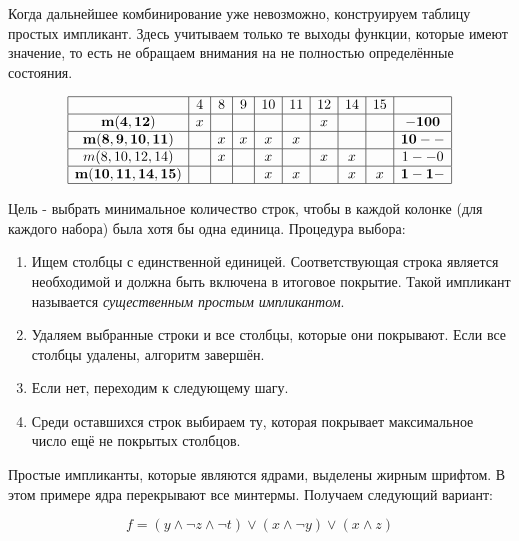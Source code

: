 \documentclass[12pt,letterpaper]{article}
\begin{document}
Когда дальнейшее комбинирование уже невозможно, конструируем таблицу простых импликант. Здесь учитываем только те выходы функции, которые имеют значение, то есть не обращаем внимания на не полностью определённые состояния.

\[
\begin{array}{|c|c|c|c|c|c|c|c|c|c|}
\hline
 & 4 & 8 & 9 & 10 & 11 & 12 & 14 & 15 & \\
\hline
\mathbf{m(4,12)} & x &   &   &   &   & x &   &   & \mathbf{-100} \\
\hline
\mathbf{m(8,9,10,11)} &   & x & x & x & x &   &   &   & \mathbf{10--} \\
\hline
m(8,10,12,14) &   & x &   & x &   & x & x &   & 1--0 \\
\hline
\mathbf{m(10,11,14,15)} &   &   &   & x & x &   & x & x & \mathbf{1-1-} \\
\hline
\end{array}
\]

Цель - выбрать минимальное количество строк, чтобы в каждой колонке (для каждого набора) была хотя бы одна единица. Процедура выбора:
\begin{enumerate}
  \item Ищем столбцы с единственной единицей. Соответствующая строка является необходимой и должна быть включена в итоговое покрытие. Такой импликант называется \textit{существенным простым импликантом}.
  \item Удаляем выбранные строки и все столбцы, которые они покрывают. Если все столбцы удалены, алгоритм завершён.
  \item Если нет, переходим к следующему шагу.
  \item Среди оставшихся строк выбираем ту, которая покрывает максимальное число ещё не покрытых столбцов.
\end{enumerate}

Простые импликанты, которые являются ядрами, выделены жирным шрифтом. В этом примере ядра перекрывают все минтермы. Получаем следующий вариант:

\[f = (y \wedge \neg z \wedge \neg t) \vee (x \wedge \neg y) \vee (x \wedge z)\]
\end{document}
